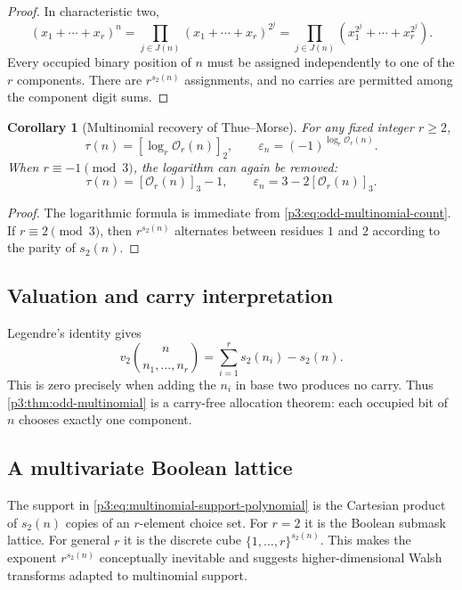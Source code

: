 \documentclass[11pt,oneside]{article}
\newtheorem{corollary}[theorem]{Corollary}
\theoremstyle{definition}
\theoremstyle{remark}
\newcommand{\vtwo}{v_2}
\newcommand{\bitsum}{s_2}
\newcommand{\eps}{\varepsilon}
\begin{document}
\begin{proof}
In characteristic two,
\[
 (x_1+\cdots+x_r)^n
 =\prod_{j\in J(n)}(x_1+\cdots+x_r)^{2^j}
 =\prod_{j\in J(n)}(x_1^{2^j}+\cdots+x_r^{2^j}).
\]
Every occupied binary position of $n$ must be assigned independently to one of
the $r$ components.  There are $r^{\bitsum(n)}$ assignments, and no carries
are permitted among the component digit sums.
\end{proof}

\begin{corollary}[Multinomial recovery of Thue--Morse]\label{p3:cor:multinomial-recovery}
For any fixed integer $r\ge2$,
\begin{equation}\label{p3:eq:multinomial-log-recovery}
 \tau(n)=\left[\log_r\mathcal O_r(n)\right]_2,
 \qquad
 \eps_n=(-1)^{\log_r\mathcal O_r(n)}.
\end{equation}
When $r\equiv-1\pmod3$, the logarithm can again be removed:
\begin{equation}\label{p3:eq:multinomial-logfree}
 \tau(n)=[\mathcal O_r(n)]_3-1,
 \qquad
 \eps_n=3-2[\mathcal O_r(n)]_3.
\end{equation}
\end{corollary}

\begin{proof}
The logarithmic formula is immediate from \cref{p3:eq:odd-multinomial-count}.  If
$r\equiv2\pmod3$, then $r^{\bitsum(n)}$ alternates between residues $1$ and
$2$ according to the parity of $\bitsum(n)$.
\end{proof}

\subsection{Valuation and carry interpretation}

Legendre's identity gives
\begin{equation}\label{p3:eq:multinomial-v2}
 \vtwo\binom{n}{n_1,\ldots,n_r}
 =\sum_{i=1}^r\bitsum(n_i)-\bitsum(n).
\end{equation}
This is zero precisely when adding the $n_i$ in base two produces no carry.
Thus \cref{p3:thm:odd-multinomial} is a carry-free allocation theorem: each
occupied bit of $n$ chooses exactly one component.

\subsection{A multivariate Boolean lattice}

The support in \cref{p3:eq:multinomial-support-polynomial} is the Cartesian
product of $\bitsum(n)$ copies of an $r$-element choice set.  For $r=2$ it is
the Boolean submask lattice.  For general $r$ it is the discrete cube
$\{1,\ldots,r\}^{\bitsum(n)}$.  This makes the exponent
$r^{\bitsum(n)}$ conceptually inevitable and suggests higher-dimensional
Walsh transforms adapted to multinomial support.
\end{document}
